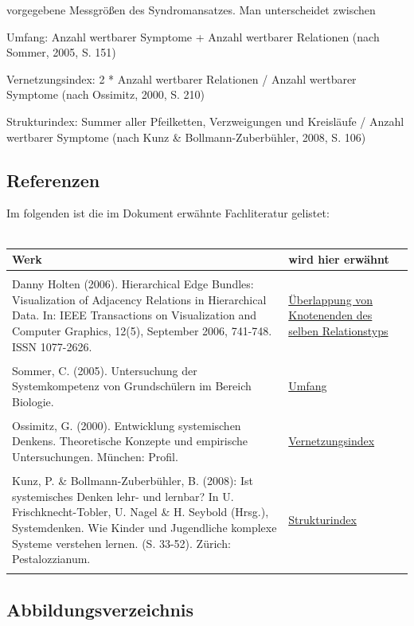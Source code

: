 \documentclass[enabledeprecatedfontcommands,fontsize=11pt,paper=a4,twoside]{scrartcl}
\newcounter{one}
\newcounter{two}[one]
\let\tempone\itemize
\let\temptwo\enditemize
\renewenvironment{itemize}{\tempone\addtolength{\itemsep}{-10.0pt}}{\temptwo}
\begin{document}
\begin{description}
	\item[Metriken/Graphmaße] vorgegebene Messgrößen des Syndromansatzes. Man unterscheidet zwischen
		\begin{itemize}
			\setlength{\itemsep}{0.5pt}
			\item Umfang: Anzahl wertbarer Symptome + Anzahl wertbarer Relationen (nach Sommer, 2005, S. 151)
			\item Vernetzungsindex: 2 * Anzahl wertbarer Relationen / Anzahl wertbarer Symptome (nach Ossimitz, 2000, S. 210)
			\item Strukturindex: Summer aller Pfeilketten, Verzweigungen und Kreisläufe / Anzahl wertbarer Symptome (nach Kunz \& Bollmann-Zuberbühler, 2008, S. 106)
		\end{itemize}
\end{description}
	

\newpage
\subsection{Referenzen} 
Im folgenden ist die im Dokument erwähnte Fachliteratur gelistet: \\ \\
\begin{tabular}{p{11cm}p{5cm}}
	Werk & wird hier erwähnt \\ \hline \\
	Danny Holten (2006). Hierarchical Edge Bundles: Visualization of Adjacency Relations in Hierarchical Data. In: IEEE Transactions on Visualization and Computer Graphics, 12(5), September 2006, 741-748. ISSN 1077-2626. & \hyperlink{cc}{Überlappung von Knotenenden des selben Relationstyps} \\ \\ 
	Sommer, C. (2005). Untersuchung der Systemkompetenz von Grundschülern im Bereich Biologie.& \hyperlink{Umfang}{Umfang} \\ \\
	Ossimitz, G. (2000). Entwicklung systemischen Denkens. Theoretische Konzepte und empirische Untersuchungen. München: Profil. & \hyperlink{Vernetzungsindex}{Vernetzungsindex} \\ \\
	Kunz, P. \& Bollmann-Zuberbühler, B. (2008): Ist systemisches Denken lehr- und lernbar? In U. Frischknecht-Tobler, U. Nagel \& H. Seybold (Hrsg.), Systemdenken. Wie Kinder und Jugendliche komplexe Systeme verstehen lernen. (S. 33-52). Zürich: Pestalozzianum. & \hyperlink{Strukturindex}{Strukturindex} \\ \\
\end{tabular}


\newpage

\subsection{Abbildungsverzeichnis}
\listoffigures
\end{document}
